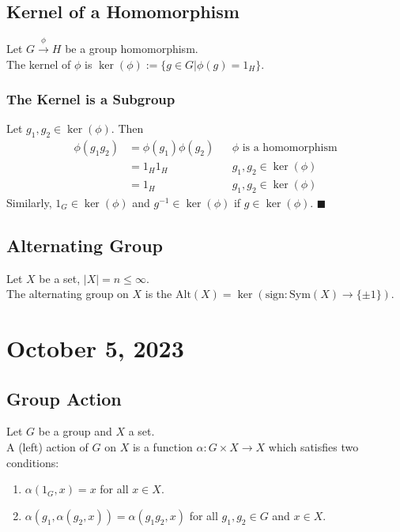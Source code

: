\documentclass[11pt]{article}
\newcommand{\0}{\emptyset}
\begin{document}
\subsection*{Kernel of a Homomorphism}
\label{sec:orge5f583d}
Let \(G\overset{\phi}{\to}H\) be a group homomorphism.\\[0pt]
The kernel of \(\phi\) is \(\ker(\phi):=\{g\in G|\phi(g)=1_{H}\}\).\\[0pt]
\subsubsection*{The Kernel is a Subgroup}
\label{sec:orgb09b233}
Let \(g_{1},g_{2}\in\ker(\phi)\). Then\\[0pt]
\begin{align*}
  \phi(g_{1}g_{2})
  &=\phi(g_{1})\phi(g_{2}) && \phi\text{ is a homomorphism}
  \\&=1_{H}1_{H} && g_{1},g_{2}\in\ker(\phi)
  \\&=1_{H} && g_{1},g_{2}\in\ker(\phi)
\end{align*}
Similarly, \(1_{G}\in\ker(\phi)\) and \(g^{-1}\in\ker(\phi)\) if \(g\in\ker(\phi)\). \(\blacksquare\) \\[0pt]
\subsection*{Alternating Group}
\label{sec:org9ba38bb}
Let \(X\) be a set, \(|X|=n\leq\infty\).\\[0pt]
The alternating group on \(X\) is the \(\text{Alt}(X)=\ker(\text{sign}:\text{Sym}(X)\to\{\pm1\})\).\\[0pt]
\section*{October 5, 2023}
\label{sec:orgdde86d0}
\subsection*{Group Action}
\label{sec:org23818e3}
Let \(G\) be a group and \(X\) a set.\\[0pt]
A (left) action of \(G\) on \(X\) is a function \(\alpha:G\times X\to X\) which satisfies two conditions:\\[0pt]
\begin{enumerate}
\item \(\alpha(1_{G},x)=x\) for all \(x\in X\).\\[0pt]
\item \(\alpha(g_{1},\alpha(g_{2},x))=\alpha(g_{1}g_{2},x)\) for all \(g_{1},g_{2}\in G\) and \(x\in X\).\\[0pt]
\end{enumerate}
\end{document}
